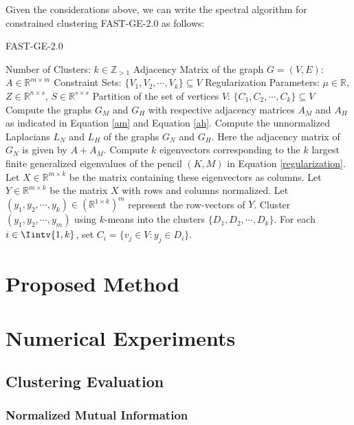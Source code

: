 Given the considerations above, we can write the spectral algorithm for constrained clustering FAST-GE-2.0 as follows:
\begin{algorithm}
\caption{FAST-GE-2.0}\label{fastge2alg}
\begin{algorithmic}[1]
   \Require 
      \Statex Number of Clusters: $k \in \mathbb Z_{>1}$
      \Statex Adjacency Matrix of the graph $G=(V,E)$: $A \in \mathbb R ^ {m \times m}$ 
      \Statex Constraint Sets: $\{ V_1, V_2, \cdots, V_k \} \subseteq V$
      \Statex Regularization Parameters: $\mu \in \mathbb R$, $Z \in \mathbb R ^{n \times s}$, $S \in \mathbb R ^{s \times s}$
   \Ensure 
      \Statex Partition of the set of vertices $V$: $\{ C_1, C_2, \cdots, C_k \} \subseteq V$
   \State Compute the graphs $G_M$ and $G_H$ with respective adjacency matrices $A_M$ and $A_H$ as indicated in Equation \vref{am} and Equation \vref{ah}.
   \State Compute the unnormalized Laplacians $L_N$ and $L_H$ of the graphs $G_N$ and $G_H$. Here the adjacency matrix of $G_N$ is given by $A + A_M$.
   \State Compute $k$ eigenvectors corresponding to the $k$ largest finite generalized eigenvalues of the pencil $(K,M)$ in Equation \vref{regularization}. Let $X \in \mathbb R ^{m \times k}$ be the matrix containing these eigenvectors as columns.
   \State Let $Y \in \mathbb R ^{m \times k}$ be the matrix $X$ with rows and columns normalized.
   \State Let $(y_1, y_2, \cdots, y_k) \in (\mathbb R^{1 \times k})^m$ represent the row-vectors of $Y$.
   \State Cluster $(y_1, y_2, \cdots, y_m)$ using $k$-means into the clusters $ \{ D_1, D_2, \cdots, D_k \}$.
   \State For each $i \in \Iintv{1,k}$, set $C_i = \{ v_j \in V: y_j \in D_i \}$.
\end{algorithmic}
\end{algorithm}



\chapter{Proposed Method}


\chapter{Numerical Experiments}
\section{Clustering Evaluation}
\subsection{Normalized Mutual Information}

